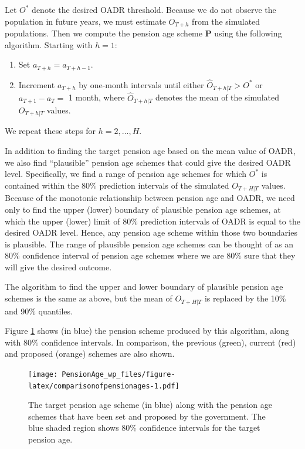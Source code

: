\documentclass[11pt,a4paper,]{article}
\providecommand{\tightlist}{%
  \setlength{\itemsep}{0pt}\setlength{\parskip}{0pt}}
\begin{document}
Let \(O^*\) denote the desired OADR threshold. Because we do not observe the population in future years, we must estimate \(O_{T+h}\) from the simulated populations. Then we compute the pension age scheme \(\bm{P}\) using the following algorithm. Starting with \(h=1\):

\begin{enumerate}
\def\labelenumi{\arabic{enumi}.}
\tightlist
\item
  Set \(a_{T+h}=a_{T+h-1}\).
\item
  Increment \(a_{T+h}\) by one-month intervals until either \(\widehat{O}_{T+h|T} > O^*\) or \(a_{T+1} - a_{T}=\) 1 month, where \(\widehat{O}_{T+h|T}\) denotes the mean of the simulated \(O_{T+h|T}\) values.
\end{enumerate}

We repeat these steps for \(h=2,\dots,H\).

In addition to finding the target pension age based on the mean value of OADR, we also find ``plausible'' pension age schemes that could give the desired OADR level. Specifically, we find a range of pension age schemes for which \(O^*\) is contained within the 80\% prediction intervals of the simulated \(O_{T+H|T}\) values. Because of the monotonic relationship between pension age and OADR, we need only to find the upper (lower) boundary of plausible pension age schemes, at which the upper (lower) limit of 80\% prediction intervals of OADR is equal to the desired OADR level. Hence, any pension age scheme within those two boundaries is plausible. The range of plausible pension age schemes can be thought of as an 80\% confidence interval of pension age schemes where we are 80\% sure that they will give the desired outcome.

The algorithm to find the upper and lower boundary of plausible pension age schemes is the same as above, but the mean of \(O_{T+H|T}\) is replaced by the 10\% and 90\% quantiles.

Figure \ref{fig:comparisonofpensionages} shows (in blue) the pension scheme produced by this algorithm, along with 80\% confidence intervals. In comparison, the previous (green), current (red) and proposed (orange) schemes are also shown.

\begin{figure}
\centering
\texttt{[image: PensionAge\_wp\_files/figure-latex/comparisonofpensionages-1.pdf]}
\caption{\label{fig:comparisonofpensionages}The target pension age scheme (in blue) along with the pension age schemes that have been set and proposed by the government. The blue shaded region shows 80\% confidence intervals for the target pension age.}
\end{figure}
\end{document}
